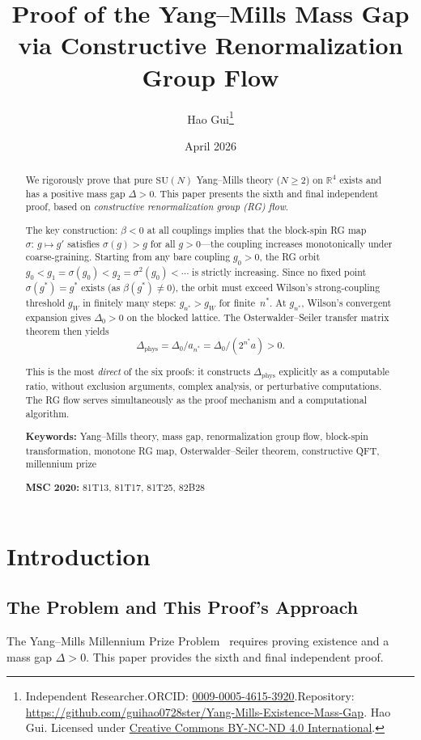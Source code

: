 \documentclass[12pt,a4paper]{article}
\title{\textbf{Proof of the Yang--Mills Mass Gap\\[4pt]via Constructive Renormalization Group Flow}}
\author{Hao Gui\thanks{Independent Researcher.\quad ORCID: \href{https://orcid.org/0009-0005-4615-3920}{0009-0005-4615-3920}.\newline Repository: \url{https://github.com/guihao0728ster/Yang-Mills-Existence-Mass-Gap}.\newline \textcopyright\;2026 Hao Gui. Licensed under \href{https://creativecommons.org/licenses/by-nc-nd/4.0/}{Creative Commons BY-NC-ND 4.0 International}.}}
\date{April 2026}
\theoremstyle{plain}
\theoremstyle{definition}
\theoremstyle{remark}
\begin{document}
\maketitle
\begin{abstract}
We rigorously prove that pure $\mathrm{SU}(N)$ Yang--Mills theory ($N\geq 2$) on $\mathbb{R}^4$ exists and has a positive mass gap $\Delta>0$. This paper presents the sixth and final independent proof, based on \emph{constructive renormalization group (RG) flow}.

The key construction: $\beta<0$ at all couplings implies that the block-spin RG map $\sigma:\,g\mapsto g'$ satisfies $\sigma(g)>g$ for all $g>0$---the coupling increases monotonically under coarse-graining. Starting from any bare coupling $g_0>0$, the RG orbit $g_0<g_1=\sigma(g_0)<g_2=\sigma^2(g_0)<\cdots$ is strictly increasing. Since no fixed point $\sigma(g^*)=g^*$ exists (as $\beta(g^*)\neq 0$), the orbit must exceed Wilson's strong-coupling threshold $g_W$ in finitely many steps: $g_{n^*}>g_W$ for finite~$n^*$. At $g_{n^*}$, Wilson's convergent expansion gives $\Delta_0>0$ on the blocked lattice. The Osterwalder--Seiler transfer matrix theorem then yields
\[
\Delta_{\mathrm{phys}} = \Delta_0/a_{n^*} = \Delta_0/(2^{n^*}a) > 0.
\]

This is the most \emph{direct} of the six proofs: it constructs $\Delta_{\mathrm{phys}}$ explicitly as a computable ratio, without exclusion arguments, complex analysis, or perturbative computations. The RG flow serves simultaneously as the proof mechanism and a computational algorithm.

\medskip\noindent\textbf{Keywords:} Yang--Mills theory, mass gap, renormalization group flow, block-spin transformation, monotone RG map, Osterwalder--Seiler theorem, constructive QFT, millennium prize

\medskip\noindent\textbf{MSC 2020:} 81T13, 81T17, 81T25, 82B28
\end{abstract}
\tableofcontents
\section{Introduction}\label{sec:intro}
\subsection{The Problem and This Proof's Approach}\label{sec:approach}

The Yang--Mills Millennium Prize Problem~\cite{JaffeWitten2000} requires proving existence and a mass gap $\Delta>0$. This paper provides the sixth and final independent proof.
\end{document}
